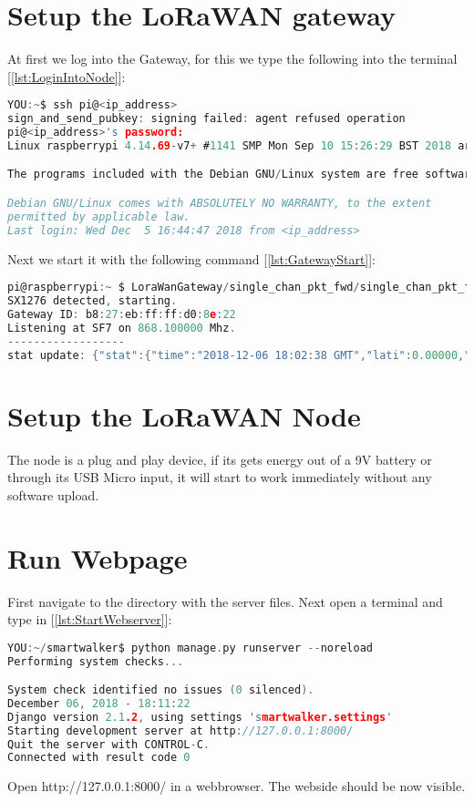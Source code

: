 \section{Setup the LoRaWAN gateway}

At first we log into the Gateway, for this we type the following into the terminal [\ref{lst:LoginIntoNode}]:
\begin{lstlisting}[language=c,frame=tb,caption={Logging into the gateway},label=lst:LoginIntoNode]
YOU:~$ ssh pi@<ip_address>
sign_and_send_pubkey: signing failed: agent refused operation
pi@<ip_address>'s password: 
Linux raspberrypi 4.14.69-v7+ #1141 SMP Mon Sep 10 15:26:29 BST 2018 armv7l

The programs included with the Debian GNU/Linux system are free software; the exact distribution terms for each program are described in the individual files in /usr/share/doc/*/copyright.

Debian GNU/Linux comes with ABSOLUTELY NO WARRANTY, to the extent
permitted by applicable law.
Last login: Wed Dec  5 16:44:47 2018 from <ip_address>
\end{lstlisting}

Next we start it with the following command [\ref{lst:GatewayStart}]:
\begin{lstlisting}[language=c,frame=tb,caption={Starting LoraWAN Gateway},label=lst:GatewayStart]
pi@raspberrypi:~ $ LoraWanGateway/single_chan_pkt_fwd/single_chan_pkt_fwd 
SX1276 detected, starting.
Gateway ID: b8:27:eb:ff:ff:d0:8e:22
Listening at SF7 on 868.100000 Mhz.
------------------
stat update: {"stat":{"time":"2018-12-06 18:02:38 GMT","lati":0.00000,"long":0.00000,"alti":0,"rxnb":0,"rxok":0,"rxfw":0,"ackr":0.0,"dwnb":0,"txnb":0,"pfrm":"Single Channel Gateway","mail":"bla@gmail.com","desc":"smart walkers!!"}}
\end{lstlisting}

\section{Setup the LoRaWAN Node}
The node is a plug and play device, if its gets energy out of a 9V battery or through its USB Micro input, it will start to work immediately without any software upload.
\newpage

\section{Run Webpage}
First navigate to the directory with the server files.
Next open a terminal and type in [\ref{lst:StartWebserver}]: 
\begin{lstlisting}[language=c,frame=tb,caption={Starting Webserver},label=lst:StartWebserver]
YOU:~/smartwalker$ python manage.py runserver --noreload
Performing system checks...

System check identified no issues (0 silenced).
December 06, 2018 - 18:11:22
Django version 2.1.2, using settings 'smartwalker.settings'
Starting development server at http://127.0.0.1:8000/
Quit the server with CONTROL-C.
Connected with result code 0
\end{lstlisting}

Open http://127.0.0.1:8000/ in a webbrowser. The webside should be now visible.

